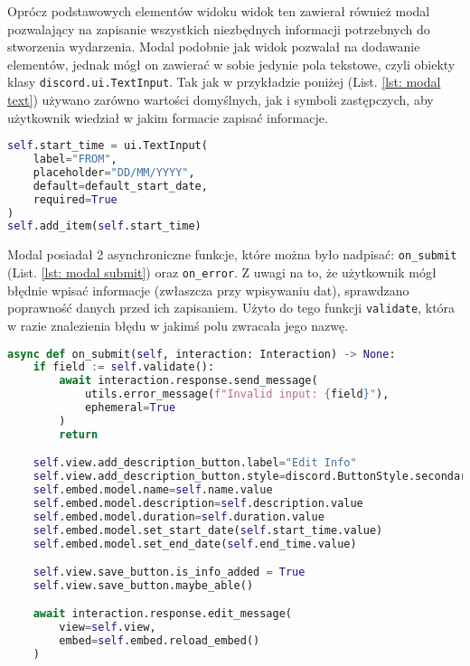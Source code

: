 \documentclass[11pt,a4paper]{article}
\newcommand{\classname}[1]{\texttt{#1}}
\begin{document}
Oprócz podstawowych elementów widoku widok ten zawierał również modal pozwalający na zapisanie wszystkich niezbędnych informacji potrzebnych do stworzenia wydarzenia. Modal podobnie jak widok pozwalał na dodawanie elementów, jednak mógł on zawierać w sobie jedynie pola tekstowe, czyli obiekty klasy \classname{discord.ui.TextInput}. Tak jak w przykładzie poniżej (List. \ref{lst: modal text}) używano zarówno wartości domyślnych, jak i symboli zastępczych, aby użytkownik wiedział w jakim formacie zapisać informacje.

\begin{lstlisting}[language=Python,caption={Dodawanie pola tekstowego do modalu},label={lst: modal text}]
self.start_time = ui.TextInput(
    label="FROM", 
    placeholder="DD/MM/YYYY", 
    default=default_start_date, 
    required=True
)
self.add_item(self.start_time)
\end{lstlisting}

Modal posiadał 2 asynchroniczne funkcje, które można było nadpisać: \classname{on\_submit} (List. \ref{lst: modal submit}) oraz \classname{on\_error}. Z uwagi na to, że użytkownik mógł błędnie wpisać informacje (zwłaszcza przy wpisywaniu dat), sprawdzano poprawność danych przed ich zapisaniem. Użyto do tego funkcji \classname{validate}, która w razie znalezienia błędu w jakimś polu zwracała jego nazwę.

\begin{lstlisting}[language=Python,caption={Metoda "on\_submit" klasy "AddDescriptionModal"},label={lst: modal submit}]
async def on_submit(self, interaction: Interaction) -> None:
    if field := self.validate():
        await interaction.response.send_message(
            utils.error_message(f"Invalid input: {field}"), 
            ephemeral=True
        )
        return

    self.view.add_description_button.label="Edit Info"
    self.view.add_description_button.style=discord.ButtonStyle.secondary
    self.embed.model.name=self.name.value
    self.embed.model.description=self.description.value
    self.embed.model.duration=self.duration.value
    self.embed.model.set_start_date(self.start_time.value)
    self.embed.model.set_end_date(self.end_time.value)

    self.view.save_button.is_info_added = True
    self.view.save_button.maybe_able()

    await interaction.response.edit_message(
        view=self.view, 
        embed=self.embed.reload_embed()
    )
\end{lstlisting}
\end{document}
